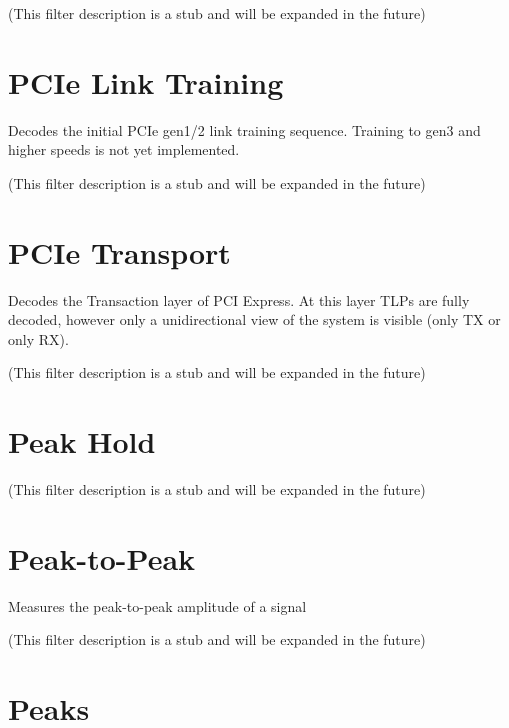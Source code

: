 (This filter description is a stub and will be expanded in the future)

\pagebreak
\section{PCIe Link Training}

Decodes the initial PCIe gen1/2 link training sequence. Training to gen3 and higher speeds is not yet implemented.

(This filter description is a stub and will be expanded in the future)

\pagebreak
\section{PCIe Transport}

Decodes the Transaction layer of PCI Express. At this layer TLPs are fully decoded, however only a unidirectional view
of the system is visible (only TX or only RX).

(This filter description is a stub and will be expanded in the future)

\pagebreak
\section{Peak Hold}

(This filter description is a stub and will be expanded in the future)

\pagebreak
\section{Peak-to-Peak}

Measures the peak-to-peak amplitude of a signal

(This filter description is a stub and will be expanded in the future)

\pagebreak
\section{Peaks}

